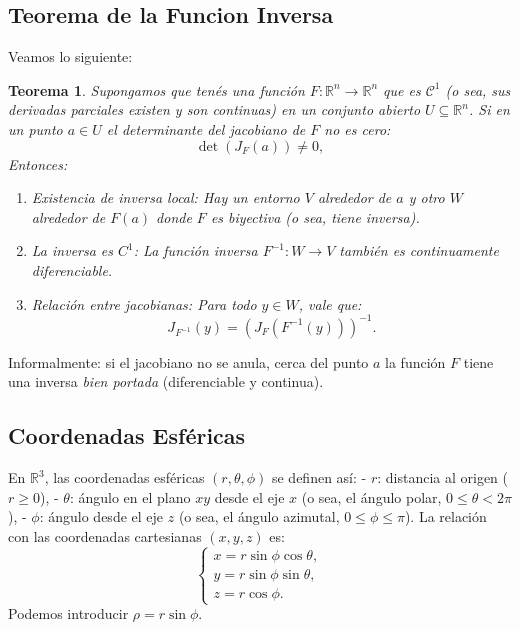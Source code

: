 \documentclass[11pt]{book}
\theoremstyle{definicion}
\theoremstyle{teorema}
\newtheorem{teorema}{Teorema}[section]
\theoremstyle{ejemplo}
\begin{document}
\subsection{Teorema de la Funcion Inversa}

\noindent
Veamos lo siguiente:

\begin{teorema}
Supongamos que tenés una función \( F: \mathbb{R}^n \to \mathbb{R}^n \) que es \( \mathcal{C}^1 \) (o sea, sus derivadas parciales existen y son continuas) en un conjunto abierto \( U \subseteq \mathbb{R}^n \). Si en un punto \( a \in U \) el \emph{determinante del jacobiano} de \( F \) no es cero:
\[
\det(J_F(a)) \neq 0,
\]
Entonces:
\begin{enumerate}
    \item \emph{Existencia de inversa local:} Hay un entorno \( V \) alrededor de \( a \) y otro \( W \) alrededor de \( F(a) \) donde \( F \) es biyectiva (o sea, tiene inversa).
\item \emph{La inversa es \( C^1 \):} La función inversa \( F^{-1}: W \to V \) también es continuamente diferenciable.
\item \emph{Relación entre jacobianas:} Para todo \( y \in W \), vale que:
   \[
   J_{F^{-1}}(y) = \left( J_F(F^{-1}(y)) \right)^{-1}.
   \]
\end{enumerate}
\end{teorema}
\noindent
Informalmente: si el jacobiano no se anula, cerca del punto \( a \) la función \( F \) tiene una inversa \emph{bien portada} (diferenciable y continua).

\subsection{Coordenadas Esféricas}

En \(\mathbb{R}^3\), las coordenadas esféricas \((r, \theta, \phi)\) se definen así:
- \( r \): distancia al origen (\( r \geq 0 \)),
- \( \theta \): ángulo en el plano \(xy\) desde el eje \(x\) (o sea, el ángulo polar, \(0 \leq \theta < 2\pi\)),
- \( \phi \): ángulo desde el eje \(z\) (o sea, el ángulo azimutal, \(0 \leq \phi \leq \pi\)).
La relación con las coordenadas cartesianas \((x, y, z)\) es:
\[
\begin{cases}
x = r \sin \phi \cos \theta, \\
y = r \sin \phi \sin \theta, \\
z = r \cos \phi.
\end{cases}
\]
Podemos introducir $\rho = r \sin \phi$.
\end{document}
